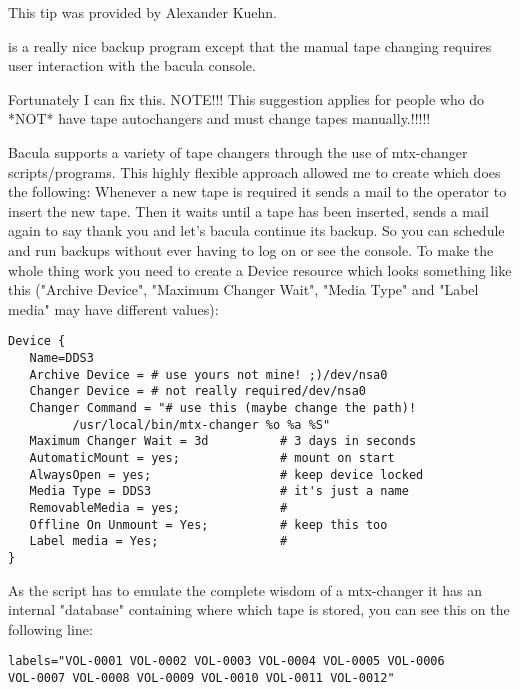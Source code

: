 This tip was provided by Alexander Kuehn.

 is a really nice backup program except
that the manual tape changing requires user interaction with the bacula
console.

Fortunately I can fix this.
NOTE!!! This suggestion applies for people who do *NOT* have tape autochangers
and must change tapes manually.!!!!!

Bacula supports a variety of tape changers through the use of mtx-changer
scripts/programs. This highly flexible approach allowed me to create
 which does the following:
Whenever a new tape is required it sends a mail to the operator to insert the
new tape. Then it waits until a tape has been inserted, sends a mail again to
say thank you and let's bacula continue its backup.
So you can schedule and run backups without ever having to log on or see the
console.
To make the whole thing work you need to create a Device resource which looks
something like this ("Archive Device", "Maximum Changer Wait", "Media
Type" and "Label media" may have different values):

\footnotesize
\begin{verbatim}
Device {
   Name=DDS3
   Archive Device = # use yours not mine! ;)/dev/nsa0
   Changer Device = # not really required/dev/nsa0
   Changer Command = "# use this (maybe change the path)!
         /usr/local/bin/mtx-changer %o %a %S"
   Maximum Changer Wait = 3d          # 3 days in seconds
   AutomaticMount = yes;              # mount on start
   AlwaysOpen = yes;                  # keep device locked
   Media Type = DDS3                  # it's just a name
   RemovableMedia = yes;              #
   Offline On Unmount = Yes;          # keep this too
   Label media = Yes;                 #
}
\end{verbatim}
\normalsize

As the script has to emulate the complete wisdom of a mtx-changer it has an
internal "database" containing where which tape is stored, you can see this on
the following line:

\footnotesize
\begin{verbatim}
labels="VOL-0001 VOL-0002 VOL-0003 VOL-0004 VOL-0005 VOL-0006
VOL-0007 VOL-0008 VOL-0009 VOL-0010 VOL-0011 VOL-0012"
\end{verbatim}
\normalsize

